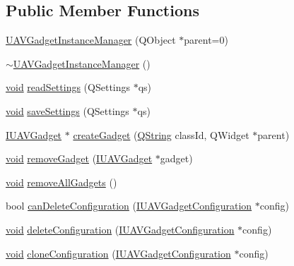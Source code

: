 \subsection*{\-Public \-Member \-Functions}
\begin{DoxyCompactItemize}
\item 
\hyperlink{group___core_plugin_ga44c56bcdae955e258b4c48a4c607ab52}{\-U\-A\-V\-Gadget\-Instance\-Manager} (\-Q\-Object $\ast$parent=0)
\item 
\hyperlink{group___core_plugin_gac38f918ffe991bf8a225fc1daad5f7de}{$\sim$\-U\-A\-V\-Gadget\-Instance\-Manager} ()
\item 
\hyperlink{group___u_a_v_objects_plugin_ga444cf2ff3f0ecbe028adce838d373f5c}{void} \hyperlink{group___core_plugin_ga5b0113d08404691baef3c9eb158f00c8}{read\-Settings} (\-Q\-Settings $\ast$qs)
\item 
\hyperlink{group___u_a_v_objects_plugin_ga444cf2ff3f0ecbe028adce838d373f5c}{void} \hyperlink{group___core_plugin_ga4256305b1cf5b29402b70613b706139c}{save\-Settings} (\-Q\-Settings $\ast$qs)
\item 
\hyperlink{class_core_1_1_i_u_a_v_gadget}{\-I\-U\-A\-V\-Gadget} $\ast$ \hyperlink{group___core_plugin_gabdaa00bfd5168cb5cea8b951735c4a93}{create\-Gadget} (\hyperlink{group___u_a_v_objects_plugin_gab9d252f49c333c94a72f97ce3105a32d}{\-Q\-String} class\-Id, \-Q\-Widget $\ast$parent)
\item 
\hyperlink{group___u_a_v_objects_plugin_ga444cf2ff3f0ecbe028adce838d373f5c}{void} \hyperlink{group___core_plugin_ga204deab3f77d2ebe76925ffd5600e6c7}{remove\-Gadget} (\hyperlink{class_core_1_1_i_u_a_v_gadget}{\-I\-U\-A\-V\-Gadget} $\ast$gadget)
\item 
\hyperlink{group___u_a_v_objects_plugin_ga444cf2ff3f0ecbe028adce838d373f5c}{void} \hyperlink{group___core_plugin_gab4ee04e79366c92b5a26aa8324876c4a}{remove\-All\-Gadgets} ()
\item 
bool \hyperlink{group___core_plugin_ga9d4a8c428b1550c2a2c831bb0c5f85b6}{can\-Delete\-Configuration} (\hyperlink{class_core_1_1_i_u_a_v_gadget_configuration}{\-I\-U\-A\-V\-Gadget\-Configuration} $\ast$config)
\item 
\hyperlink{group___u_a_v_objects_plugin_ga444cf2ff3f0ecbe028adce838d373f5c}{void} \hyperlink{group___core_plugin_ga14e36d2e3a2185db7c33574fc3ef71b8}{delete\-Configuration} (\hyperlink{class_core_1_1_i_u_a_v_gadget_configuration}{\-I\-U\-A\-V\-Gadget\-Configuration} $\ast$config)
\item 
\hyperlink{group___u_a_v_objects_plugin_ga444cf2ff3f0ecbe028adce838d373f5c}{void} \hyperlink{group___core_plugin_ga1caabd2ef4ff3c0727fad97d286bc4ed}{clone\-Configuration} (\hyperlink{class_core_1_1_i_u_a_v_gadget_configuration}{\-I\-U\-A\-V\-Gadget\-Configuration} $\ast$config)

\end{DoxyCompactItemize}

